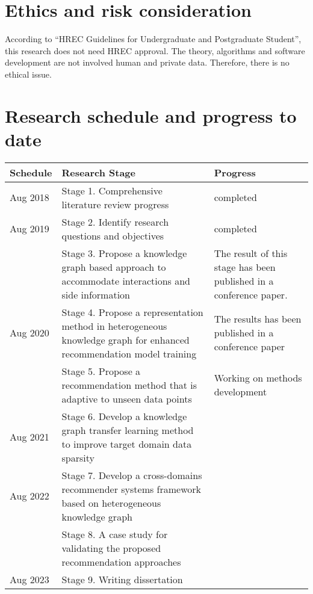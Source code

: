 \section{Ethics and risk consideration}
According to ``HREC Guidelines for Undergraduate and Postgraduate Student'', this research does not need HREC approval.
The theory, algorithms and software development are not involved human and private data. Therefore, there is no ethical issue.

\section{Research schedule and progress to date}
 

\begin{table}[h!]
    \begin{tabular}{ |p{2cm}|p{6cm}|p{4cm}|}
     \hline
        Schedule & Research Stage & Progress \\
     \hline
        \rowcolor{gray}
        Aug 2018  & Stage 1. Comprehensive literature review progress  & completed  \\
        \hline
        \rowcolor{gray}
        Aug 2019  & Stage 2. Identify research questions and objectives  & completed  \\
        \rowcolor{gray}
        & Stage 3. Propose a knowledge graph based approach to accommodate interactions and side information & The result of this stage has been published in a conference paper. \\
        \hline
        \rowcolor{lightgray}
        Aug 2020  & Stage 4. Propose a representation method in heterogeneous knowledge graph for enhanced recommendation model training & The results has been published in a conference paper  \\
        \rowcolor{lightgray}
        & Stage 5. Propose a recommendation method that is adaptive to unseen data points  & Working on methods development \\
        \hline
        Aug 2021  & Stage 6. Develop a knowledge graph transfer learning method to improve target domain data sparsity & \\
        \hline
        Aug 2022  & Stage 7. Develop a cross-domains recommender systems framework based on heterogeneous knowledge graph  & \\
        & Stage 8.  A case study for validating the proposed recommendation approaches  & \\
        \hline
        Aug 2023 & Stage 9. Writing dissertation & \\
      \hline
     \end{tabular}
\end{table}

